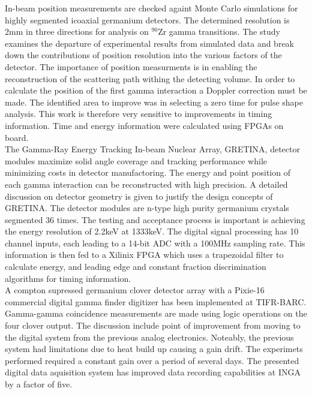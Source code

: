 \documentclass[12pt]{article}
\begin{document}
{\large\textbf{\cite{Descovich2005535}}}
In-beam position measurements are checked againt Monte Carlo simulations for highly segmented icoaxial germanium detectors. The determined resolution is 2mm in three directions for analysis on $^{90}\mbox{Zr}$ gamma transitions. The study examines the departure of experimental results from simulated data and break down the contributions of position resolution into the various factors of the detector.
The importance of position measurments is in enabling the reconstruction of the scattering path withing the detecting volume. In order to calculate the position of the first gamma interaction a Doppler correction must be made. The identified area to improve was in selecting a zero time for pulse shape analysis. This work is therefore very sensitive to improvements in timing information. Time and energy information were calculated using FPGAs on board.
\\[20pt]


{\large\textbf{\cite{Paschalis201344}}}
The Gamma-Ray Energy Tracking In-beam Nuclear Array, GRETINA, detector modules maximize solid angle coverage and tracking performance while minimizing costs in detector manufactoring. The energy and point position of each gamma interaction can be reconstructed with high precision. A detailed discussion on detector geometry is given to justify the design concepts of GRETINA. The detector modules are n-type high purity germanium crystals segmented 36 times. The testing and acceptance process is important is achieving the energy resolution of 2.2keV at 1333keV. The digital signal processing has 10 channel inputs, each leading to a 14-bit ADC with a 100MHz sampling rate. This information is then fed to a Xilinix FPGA which uses a trapezoidal filter to calculate energy, and leading edge and constant fraction discrimination algorithms for timing information.
\\[20pt]


{\large\textbf{\cite{Palit201290}}}
A compton supressed germanium clover detector array with a Pixie-16 commercial digital gamma finder digitizer has been implemented at TIFR-BARC. Gamma-gamma coincidence measurements are made using logic operations on the four clover output. The discussion include point of improvement from moving to the digital system from the previous analog electronics. Noteably, the previous system had limitations due to heat build up causing a gain drift. The experimets performed required a constant gain over a period of several days. The presented digital data aquisition system has improved data recording capabilities at INGA by a factor of five.
\\[20pt]




\end{document}
